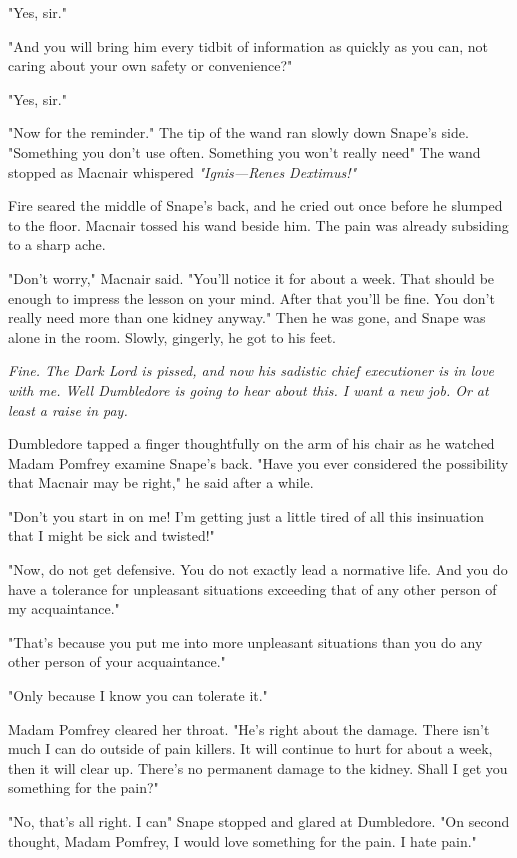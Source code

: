 "Yes, sir."

"And you will bring him every tidbit of information as quickly as you can, not caring about your own safety or convenience?"

"Yes, sir."

"Now for the reminder." The tip of the wand ran slowly down Snape's side. "Something you don't use often. Something you won't really need{\el}" The wand stopped as Macnair whispered \emph{"Ignis—Renes Dextimus!"}

Fire seared the middle of Snape's back, and he cried out once before he slumped to the floor. Macnair tossed his wand beside him. The pain was already subsiding to a sharp ache.

"Don't worry," Macnair said. "You'll notice it for about a week. That should be enough to impress the lesson on your mind. After that you'll be fine. You don't really need more than one kidney anyway." Then he was gone, and Snape was alone in the room. Slowly, gingerly, he got to his feet.

\emph{Fine. The Dark Lord is pissed, and now his sadistic chief executioner is in love with me. Well Dumbledore is going to hear about this. I want a new job. Or at least a raise in pay.}

\sbreak

Dumbledore tapped a finger thoughtfully on the arm of his chair as he watched Madam Pomfrey examine Snape's back. "Have you ever considered the possibility that Macnair may be right," he said after a while.

"Don't you start in on me! I'm getting just a little tired of all this insinuation that I might be sick and twisted!"

"Now, do not get defensive. You do not exactly lead a normative life. And you do have a{\el} tolerance for unpleasant situations exceeding that of any other person of my acquaintance."

"That's because you put me into more unpleasant situations than you do any other person of your acquaintance."

"Only because I know you can tolerate it."

Madam Pomfrey cleared her throat. "He's right about the damage. There isn't much I can do outside of pain killers. It will continue to hurt for about a week, then it will clear up. There's no permanent damage to the kidney. Shall I get you something for the pain?"

"No, that's all right. I can{\el}" Snape stopped and glared at Dumbledore. "On second thought, Madam Pomfrey, I would love something for the pain. I hate pain."

